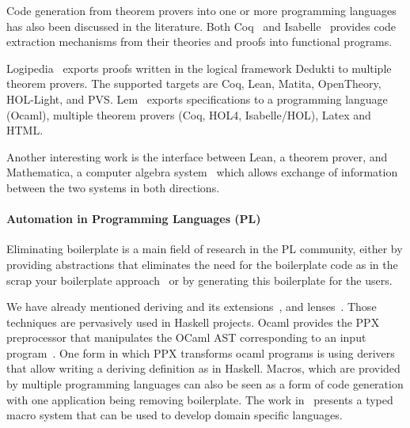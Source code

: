 Code generation from theorem provers into one or more programming languages has also been discussed in the literature. Both Coq~\cite{CoqCodegen2003, cruz2003program} and Isabelle~\cite{IsabelleCodegen2010} provides code extraction mechanisms from their theories and proofs into functional programs. 

Logipedia~\cite{Dowek2019LogipediaAM} exports proofs written in the logical framework Dedukti to multiple theorem provers. The supported targets are Coq, Lean, Matita, OpenTheory, HOL-Light, and PVS. 
Lem~\cite{lem2014} exports specifications to a programming language (Ocaml), multiple theorem provers (Coq, HOL4, Isabelle/HOL), Latex and HTML. 

Another interesting work is the interface between Lean, a theorem prover, and Mathematica, a computer algebra system~\cite{Lewis_2017} which allows exchange of information between the two systems in both directions.  



\paragraph{Automation in Programming Languages (PL)}
Eliminating boilerplate is a main field of research in the PL community, either by providing abstractions that eliminates the need for the boilerplate code as in the scrap your boilerplate approach~\cite{syb2003Jones} or by generating this boilerplate for the users.  

We have already mentioned deriving and its extensions~\cite{loeh2010genericDeriving, loeh2018derivingVia}, and lenses~\cite{lensesLib}. Those techniques are pervasively used in Haskell projects.
Ocaml provides the PPX preprocessor that manipulates the OCaml AST corresponding to an input program~\cite{ocaml2019ppx}. One form in which PPX transforms ocaml programs is using derivers that allow writing a deriving definition as in Haskell. 
Macros, which are provided by multiple programming languages can also be seen as a form of code generation with one application being removing boilerplate. The work in~\cite{macros2001msp} presents a typed macro system that can be used to develop domain specific languages. 


